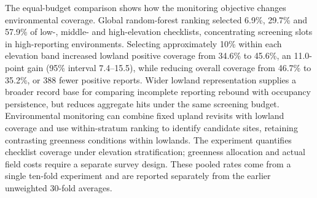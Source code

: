 The equal-budget comparison shows how the monitoring objective changes environmental coverage. Global random-forest ranking selected 6.9\%, 29.7\% and 57.9\% of low-, middle- and high-elevation checklists, concentrating screening slots in high-reporting environments. Selecting approximately 10\% within each elevation band increased lowland positive coverage from 34.6\% to 45.6\%, an 11.0-point gain (95\% interval 7.4--15.5), while reducing overall coverage from 46.7\% to 35.2\%, or 388 fewer positive reports. Wider lowland representation supplies a broader record base for comparing incomplete reporting rebound with occupancy persistence, but reduces aggregate hits under the same screening budget. Environmental monitoring can combine fixed upland revisits with lowland coverage and use within-stratum ranking to identify candidate sites, retaining contrasting greenness conditions within lowlands. The experiment quantifies checklist coverage under elevation stratification; greenness allocation and actual field costs require a separate survey design. These pooled rates come from a single ten-fold experiment and are reported separately from the earlier unweighted 30-fold averages.
\fi
\FloatBarrier
